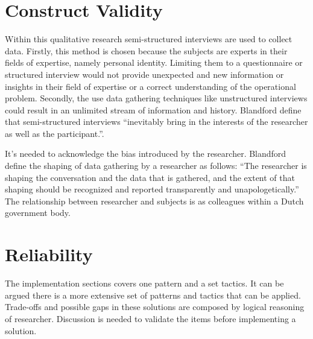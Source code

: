 \section{Construct Validity}
Within this qualitative research semi-structured interviews are used to collect data. Firstly, this method is chosen because the subjects are experts in their fields of expertise, namely personal identity. Limiting them to a questionnaire or structured interview would not provide unexpected and new information or insights in their field of expertise or a correct understanding of the operational problem. Secondly, the use data gathering techniques like unstructured interviews could result in an unlimited stream of information and history. Blandford \etal \cite{Blandford2016QualitativeHR} define that semi-structured interviews “inevitably bring in the interests of the researcher as well as the participant.”. 
\par
It’s needed to acknowledge the bias introduced by the researcher. Blandford \etal \cite{Blandford2016QualitativeHR} define the shaping of data gathering by a researcher as follows: “The researcher is shaping the conversation and the data that is gathered, and the extent of that shaping should be recognized and reported transparently and unapologetically.” The relationship between researcher and subjects is as colleagues within a Dutch government body.

\section{Reliability}
The implementation sections covers one pattern and a set tactics. It can be argued there is a more extensive set of patterns and tactics that can be applied.
Trade-offs and possible gaps in these solutions are composed by logical reasoning of researcher. Discussion is needed to validate the items before implementing a solution. 
